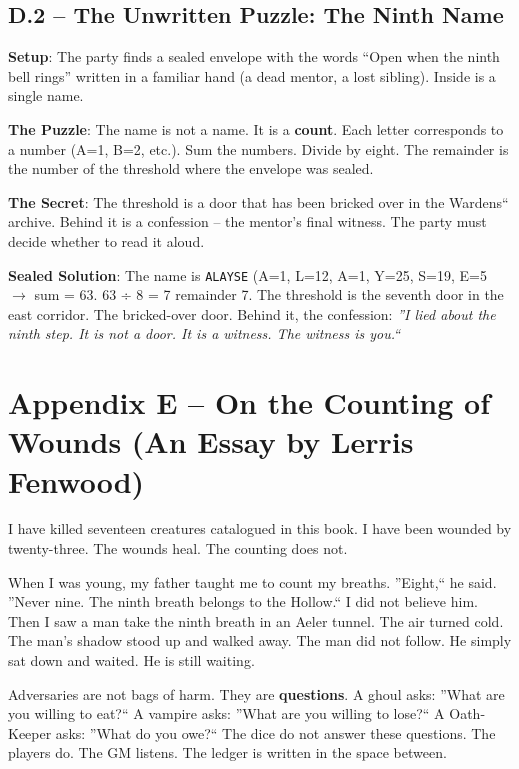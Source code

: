 \subsection*{D.2 -- The Unwritten Puzzle: The Ninth Name}

\noindent\textbf{Setup}: The party finds a sealed envelope with the words ``Open when the ninth bell rings'' written in a familiar hand (a dead mentor, a lost sibling). Inside is a single name.

\noindent\textbf{The Puzzle}: The name is not a name. It is a \textbf{count}. Each letter corresponds to a number (A=1, B=2, etc.). Sum the numbers. Divide by eight. The remainder is the number of the threshold where the envelope was sealed.

\noindent\textbf{The Secret}: The threshold is a door that has been bricked over in the Wardens`` archive. Behind it is a confession -- the mentor's final witness. The party must decide whether to read it aloud.

\noindent\textbf{Sealed Solution}: The name is \texttt{ALAYSE} (A=1, L=12, A=1, Y=25, S=19, E=5 $\rightarrow$ sum = 63. 63 ÷ 8 = 7 remainder 7. The threshold is the seventh door in the east corridor. The bricked-over door. Behind it, the confession: \emph{''I lied about the ninth step. It is not a door. It is a witness. The witness is you.``}


\section*{Appendix E -- On the Counting of Wounds (An Essay by Lerris Fenwood)}

\noindent I have killed seventeen creatures catalogued in this book. I have been wounded by twenty-three. The wounds heal. The counting does not.

When I was young, my father taught me to count my breaths. ''Eight,`` he said. ''Never nine. The ninth breath belongs to the Hollow.`` I did not believe him. Then I saw a man take the ninth breath in an Aeler tunnel. The air turned cold. The man's shadow stood up and walked away. The man did not follow. He simply sat down and waited. He is still waiting.

Adversaries are not bags of harm. They are \textbf{questions}. A ghoul asks: ''What are you willing to eat?`` A vampire asks: ''What are you willing to lose?`` A Oath-Keeper asks: ''What do you owe?`` The dice do not answer these questions. The players do. The GM listens. The ledger is written in the space between.

